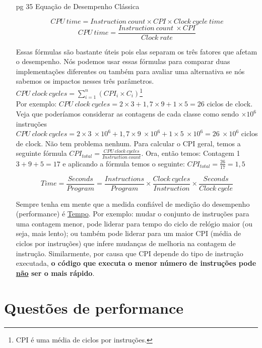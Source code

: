 \documentclass{article}
\begin{document}
\begin{enumerate}
\item[pg 35] Equação de Desempenho Clássica

$$CPU\ time = Instruction\ count \times CPI \times Clock\ cycle\ time$$
$$CPU\ time = \frac{Instruction\ count\ \times CPI}{Clock\ rate}$$

Essas fórmulas são bastante úteis pois elas separam os três fatores que afetam 
o desempenho. Nós podemos usar essas fórmulas para comparar duas implementações 
diferentes ou também para avaliar uma alternativa se nós sabemos os impactos 
nesses três parâmetros.\\

$CPU\ clock\ cycles = \sum_{i=1}^{n}(CPI_{i} \times C_{i})$\footnote{CPI é 
uma média de ciclos por instruções.}\\

Por exemplo: $CPU\ clock\ cycles = 2 \times 3 + 1,7 \times 9 + 1 \times 5 =
26$ ciclos de clock. Veja que poderíamos considerar as contagens de cada classe
como sendo $\times 10^{6}$ instruções $CPU\ clock\ cycles = 2 \times 3\ \times
10^{6} + 1,7 \times 9\ \times 10^{6} + 1 \times 5\ \times 10^{6} = 26\ \times
10^{6}$ ciclos de clock. Não tem problema nenhum. Para calcular o CPI geral,
temos a seguinte fórmula $CPI_{total} = \frac{CPU\ clock\ cycles}{Instruction\
count}$. Ora, então temos: Contagem 1 $3+9+5=17$ e aplicando a fórmula temos o 
seguinte: $CPI_{total} = \frac{26}{17}=1,5$

$$Time=\frac{Seconds}{Program}=\frac{Instructions}{Program}\times\frac{Clock\ 
cycles}{Instruction}\times\frac{Seconds}{Clock\ cycle}$$

Sempre tenha em mente que a medida confiável de medição do desempenho 
(performance) é \underline{Tempo}. Por exemplo: mudar o conjunto de instruções 
para uma contagem menor, pode liderar para tempo do ciclo de relógio maior (ou 
seja, mais lento); ou também pode liderar para um maior CPI (média de ciclos 
por instruções) que infere mudanças de melhoria na contagem de instrução. 
Similarmente, por causa que CPI depende do tipo de instrução executada, 
{\bfseries \color{Red} \Large o código que executa o menor número de 
instruções pode \underline{não} ser o mais rápido}.

\end{enumerate}

\clearpage%
\section{Questões de performance}
\end{document}
